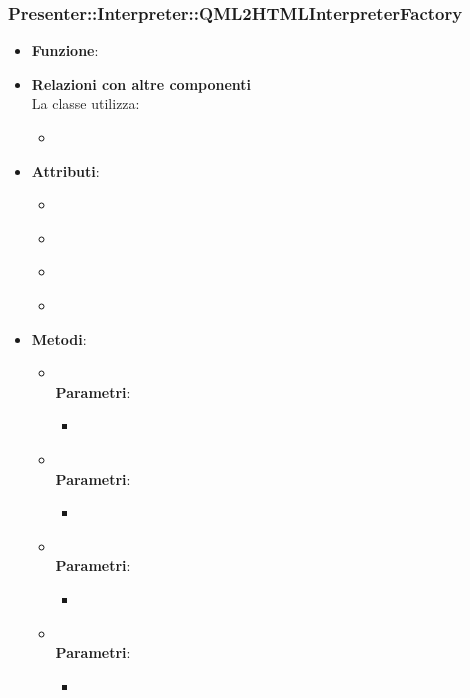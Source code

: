 \subsubsection{Presenter::Interpreter::QML2HTMLInterpreterFactory}
\begin{itemize}
\item\textbf{Funzione}:
\item\textbf{Relazioni con altre componenti}\\
La classe utilizza:
	\begin{itemize}
		\item
	\end{itemize}
\item\textbf{Attributi}:
	\begin{itemize}
		\item\code{}\\
		\item\code{}\\
		\item\code{}\\
		\item\code{}\\
	\end{itemize}
\item\textbf{Metodi}:
	\begin{itemize}
		\item\code{}\\
		\textbf{Parametri}:
			\begin{itemize}
				\item\code{}\\
			\end{itemize}
		\item\code{}\\
		\textbf{Parametri}:
			\begin{itemize}
				\item\code{}\\
			\end{itemize}
		\item\code{}\\
		\textbf{Parametri}:
			\begin{itemize}
				\item\code{}\\
			\end{itemize}
		\item\code{}\\
		\textbf{Parametri}:
			\begin{itemize}
				\item\code{}\\
			\end{itemize}
	\end{itemize}
\end{itemize}


